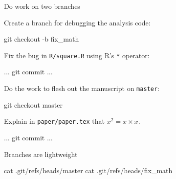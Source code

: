 \begin{frame}[fragile]{Do work on two branches}

  Create a branch for debugging the analysis code:

  \begin{gitCommand}git checkout -b fix_math\end{gitCommand}

  Fix the bug in \texttt{R/square.R} using R's \texttt{*} operator:

  \begin{gitCommand}
...
git commit ...
  \end{gitCommand}

  Do the work to flesh out the manuscript on \texttt{master}:

  \begin{gitCommand}git checkout master\end{gitCommand}

  Explain in \texttt{paper/paper.tex} that $ x^2 = x \times x $.

  \begin{gitCommand}
...
git commit ...
  \end{gitCommand}
\end{frame}

\begin{frame}[fragile]{Branches are lightweight}
  \begin{gitCommand}
cat .git/refs/heads/master
cat .git/refs/heads/fix_math
  \end{gitCommand}
\end{frame}

